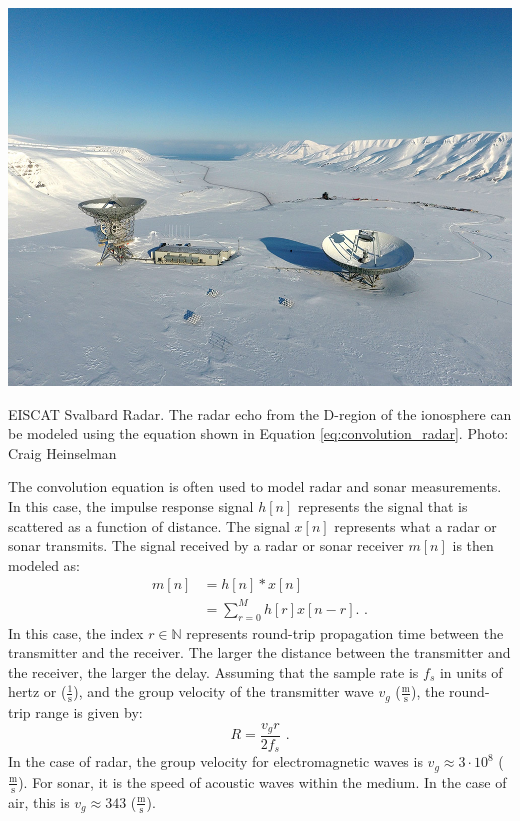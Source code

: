 \begin{marginfigure}
\begin{center}
\includegraphics[width=\textwidth]{Applications/figures/svalbard.jpg}
\end{center}
\caption{EISCAT Svalbard Radar. The radar echo from the D-region of the ionosphere can be modeled using the equation shown in Equation \ref{eq:convolution_radar}. Photo: Craig Heinselman}
\label{fig:eiscat_svalbard}
\end{marginfigure}
The convolution equation is often used to model radar and sonar
measurements. In this case, the impulse response signal $h[n]$
represents the signal that is scattered as a function of distance. The
signal $x[n]$ represents what a radar or sonar transmits. The signal
received by a radar or sonar receiver $m[n]$ is then modeled as:
\begin{align}
m[n] &=  h[n]*x[n]\\
     &= \sum_{r=0}^{M} h[r] x[n-r]. \label{eq:convolution_radar}\,\,.
\end{align}
In this case, the index $r \in \mathbb{N}$ represents round-trip
propagation time between the transmitter and the receiver. The larger
the distance between the transmitter and the receiver, the larger the
delay. Assuming that the sample rate is $f_s$ in units of hertz or
($\frac{1}{\mathrm{s}}$), and the group velocity of the transmitter
wave $v_g$ ($\frac{\mathrm{m}}{\mathrm{s}}$), the round-trip range is given by:
\begin{equation}
R = \frac{v_g r}{2 f_s}\,\,.
\end{equation}
In the case of radar, the group velocity for electromagnetic waves is
$v_g \approx 3 \cdot 10^8$ ($\frac{\mathrm{m}}{\mathrm{s}}$). For sonar, it is the speed of
acoustic waves within the medium. In the case of air, this is
$v_g \approx 343$ ($\frac{\mathrm{m}}{\mathrm{s}}$).


